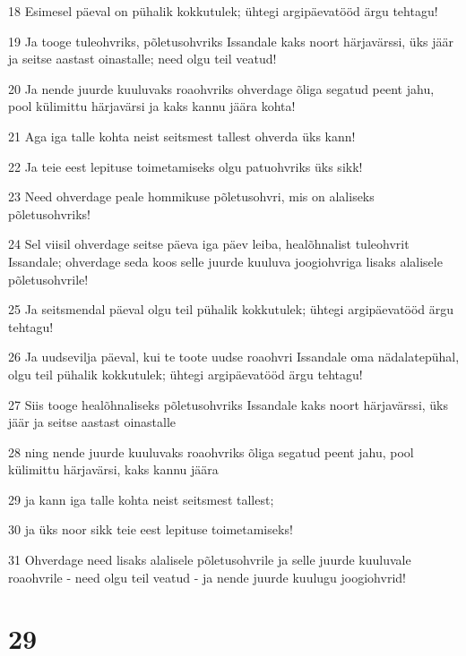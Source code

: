\par 18 Esimesel päeval on pühalik kokkutulek; ühtegi argipäevatööd ärgu tehtagu!
\par 19 Ja tooge tuleohvriks, põletusohvriks Issandale kaks noort härjavärssi, üks jäär ja seitse aastast oinastalle; need olgu teil veatud!
\par 20 Ja nende juurde kuuluvaks roaohvriks ohverdage õliga segatud peent jahu, pool külimittu härjavärsi ja kaks kannu jäära kohta!
\par 21 Aga iga talle kohta neist seitsmest tallest ohverda üks kann!
\par 22 Ja teie eest lepituse toimetamiseks olgu patuohvriks üks sikk!
\par 23 Need ohverdage peale hommikuse põletusohvri, mis on alaliseks põletusohvriks!
\par 24 Sel viisil ohverdage seitse päeva iga päev leiba, healõhnalist tuleohvrit Issandale; ohverdage seda koos selle juurde kuuluva joogiohvriga lisaks alalisele põletusohvrile!
\par 25 Ja seitsmendal päeval olgu teil pühalik kokkutulek; ühtegi argipäevatööd ärgu tehtagu!
\par 26 Ja uudsevilja päeval, kui te toote uudse roaohvri Issandale oma nädalatepühal, olgu teil pühalik kokkutulek; ühtegi argipäevatööd ärgu tehtagu!
\par 27 Siis tooge healõhnaliseks põletusohvriks Issandale kaks noort härjavärssi, üks jäär ja seitse aastast oinastalle
\par 28 ning nende juurde kuuluvaks roaohvriks õliga segatud peent jahu, pool külimittu härjavärsi, kaks kannu jäära
\par 29 ja kann iga talle kohta neist seitsmest tallest;
\par 30 ja üks noor sikk teie eest lepituse toimetamiseks!
\par 31 Ohverdage need lisaks alalisele põletusohvrile ja selle juurde kuuluvale roaohvrile - need olgu teil veatud - ja nende juurde kuulugu joogiohvrid!

\chapter{29}

